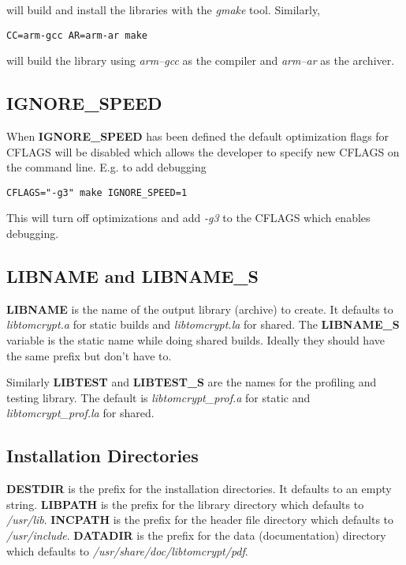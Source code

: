 \documentclass[synpaper]{book}
\begin{document}
\begin{flushleft} will build and install the libraries with the \textit{gmake} tool.  Similarly, \end{flushleft}

\begin{verbatim}
CC=arm-gcc AR=arm-ar make
\end{verbatim}

\begin{flushleft} will build the library using \textit{arm--gcc} as the compiler and \textit{arm--ar} as the archiver. \end{flushleft}

\subsection{IGNORE\_SPEED}
When \textbf{IGNORE\_SPEED} has been defined the default optimization flags for CFLAGS will be disabled which allows the developer to specify new
CFLAGS on the command line.  E.g. to add debugging

\begin{verbatim}
CFLAGS="-g3" make IGNORE_SPEED=1
\end{verbatim}

This will turn off optimizations and add \textit{-g3} to the CFLAGS which enables debugging.

\subsection{LIBNAME and LIBNAME\_S}
 
\textbf{LIBNAME} is the name of the output library (archive) to create.  It defaults to \textit{libtomcrypt.a} for static builds and \textit{libtomcrypt.la} for
shared.  The \textbf{LIBNAME\_S} variable is the static name while doing shared builds.  Ideally they should have the same prefix but don't have to.

 
Similarly \textbf{LIBTEST} and \textbf{LIBTEST\_S} are the names for the profiling and testing library.  The default is \textit{libtomcrypt\_prof.a} for
static and \textit{libtomcrypt\_prof.la} for shared.

\subsection{Installation Directories}
   
\textbf{DESTDIR} is the prefix for the installation directories.  It defaults to an empty string.  \textbf{LIBPATH} is the prefix for the library
directory which defaults to \textit{/usr/lib}.  \textbf{INCPATH} is the prefix for the header file directory which defaults to \textit{/usr/include}.
\textbf{DATADIR} is the prefix for the data (documentation) directory which defaults to \textit{/usr/share/doc/libtomcrypt/pdf}.
\end{document}
